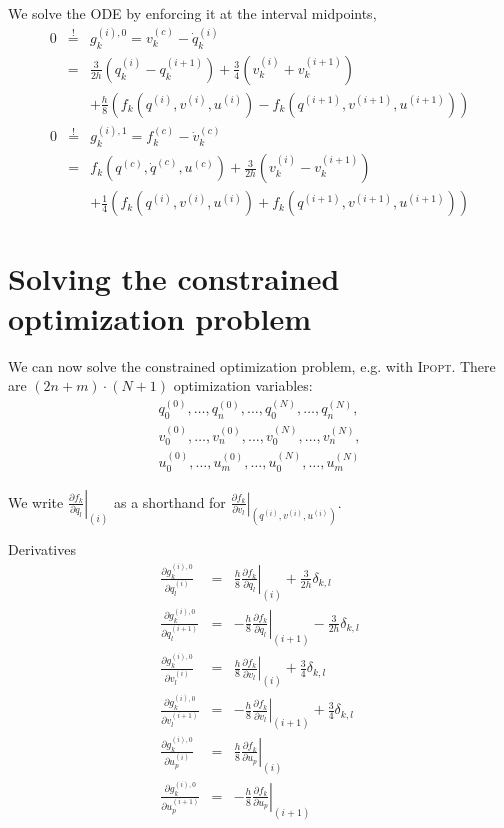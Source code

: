 \documentclass[a4paper]{article}
\begin{document}
We solve the ODE by enforcing it at the interval midpoints,
\begin{eqnarray}
0 &\stackrel{!}{=}& g_k^{(i),0} = v_k^{(c)} - \dot{q}_k^{(i)}\\
&=& \frac{3}{2h} \left( q_k^{(i)} - q_k^{(i+1)} \right)
+ \frac{3}{4}\left( v_k^{(i)} + v_k^{(i+1)} \right)\nonumber \\
&&+ \frac{h}{8}\left( f_k(q^{(i)}, v^{(i)}, u^{(i)}) - f_k(q^{(i+1)}, v^{(i+1)}, u^{(i+1)}) \right)\nonumber
\end{eqnarray}
\begin{eqnarray}
0 &\stackrel{!}{=}& g_k^{(i),1} = f_k^{(c)} - \dot{v}_k^{(c)}\\
&=& f_k(q^{(c)}, \dot{q}^{(c)}, u^{(c)}) + \frac{3}{2h} \left( v_k^{(i)} - v_k^{(i+1)} \right) \nonumber \\
&& + \frac{1}{4} \left( f_k(q^{(i)}, v^{(i)}, u^{(i)}) + f_k(q^{(i+1)}, v^{(i+1)}, u^{(i+1)}) \right) \nonumber
\end{eqnarray}

\section{Solving the constrained optimization problem}
We can now solve the constrained optimization problem, e.g. with \textsc{Ipopt}. There are $(2n + m)\cdot (N+1)$ optimization variables:
\begin{eqnarray*}
q_0^{(0)}, \ldots, q_n^{(0)}, \ldots, q_0^{(N)}, \ldots, q_n^{(N)},\\
v_0^{(0)}, \ldots, v_n^{(0)}, \ldots, v_0^{(N)}, \ldots, v_n^{(N)},\\
u_0^{(0)}, \ldots, u_m^{(0)}, \ldots, u_0^{(N)}, \ldots, u_m^{(N)}
\end{eqnarray*}

We write $\left. \frac{\partial f_k}{\partial q_l} \right|_{(i)}$ as a shorthand for $\left. \frac{\partial f_k}{\partial v_l} \right|_{(q^{(i)}, v^{(i)}, u^{(i)})}$.

Derivatives
\begin{eqnarray}
\frac{\partial g_k^{(i),0}}{\partial q_l^{(i)}} 
&=& \left. \frac{h}{8} \frac{\partial f_k}{\partial q_l} \right|_{(i)}
 + \frac{3}{2h} \delta_{k,l}\\
\frac{\partial g_k^{(i),0}}{\partial q_l^{(i+1)}} 
&=& -\left. \frac{h}{8} \frac{\partial f_k}{\partial q_l} \right|_{(i+1)}
 - \frac{3}{2h} \delta_{k,l}\\
\frac{\partial g_k^{(i),0}}{\partial v_l^{(i)}} 
&=& \left. \frac{h}{8} \frac{\partial f_k}{\partial v_l} \right|_{(i)}
 + \frac{3}{4} \delta_{k,l}\\
\frac{\partial g_k^{(i),0}}{\partial v_l^{(i+1)}} 
&=& -\left. \frac{h}{8} \frac{\partial f_k}{\partial v_l} \right|_{(i+1)}
 + \frac{3}{4} \delta_{k,l}\\
 \frac{\partial g_k^{(i),0}}{\partial u_p^{(i)}} 
&=& \left. \frac{h}{8} \frac{\partial f_k}{\partial u_p} \right|_{(i)}\\
 \frac{\partial g_k^{(i),0}}{\partial u_p^{(i+1)}} 
&=& -\left. \frac{h}{8} \frac{\partial f_k}{\partial u_p} \right|_{(i+1)}
\end{eqnarray}
\end{document}
